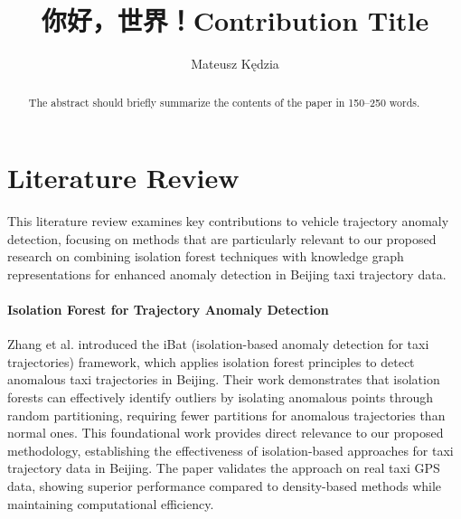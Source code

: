 \documentclass[runningheads]{llncs}
\newcommand{\zh}[1]{{\chinesefont #1}}
\begin{document}

\title{ \zh{你好，世界！}Contribution Title}
%
%
\author{Mateusz Kędzia}
%
\authorrunning{ \zh{你好，世界！} Author et al.}
%
%
\maketitle      %
%
\begin{abstract}
The abstract should briefly summarize the contents of the paper in
150--250 words.

\end{abstract}
%
%
\newpage

\section{Literature Review}
\label{sec:literature-review}

This literature review examines key contributions to vehicle trajectory anomaly detection, focusing on methods that are particularly relevant to our proposed research on combining isolation forest techniques with knowledge graph representations for enhanced anomaly detection in Beijing taxi trajectory data.

\paragraph{Isolation Forest for Trajectory Anomaly Detection}
Zhang et al. introduced the iBat (isolation-based anomaly detection for taxi trajectories) framework, which applies isolation forest principles to detect anomalous taxi trajectories in Beijing. Their work demonstrates that isolation forests can effectively identify outliers by isolating anomalous points through random partitioning, requiring fewer partitions for anomalous trajectories than normal ones. This foundational work provides direct relevance to our proposed methodology, establishing the effectiveness of isolation-based approaches for taxi trajectory data in Beijing. The paper validates the approach on real taxi GPS data, showing superior performance compared to density-based methods while maintaining computational efficiency.
\end{document}
